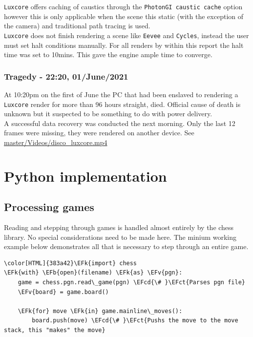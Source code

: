 \documentclass[11pt]{article}
\newcommand{\EFk}[1]{\textcolor{EFk}{#1}} %
\newcommand{\EFb}[1]{\textcolor{EFb}{#1}} %
\newcommand{\EFct}[1]{\textcolor{EFct}{#1}} %
\newcommand{\EFv}[1]{\textcolor{EFv}{#1}} %
\newcommand{\EFcd}[1]{\textcolor{EFcd}{#1}} %
\begin{document}
\texttt{Luxcore} offers caching of caustics through the \texttt{PhotonGI caustic cache} option
however this is only applicable when the scene this static (with the exception of the
camera) and traditional path tracing is used.\\

\texttt{Luxcore} does not finish rendering a scene like \texttt{Eevee} and \texttt{Cycles}, instead
the user must set halt conditions manually. For all renders by within this
report the halt time was set to 10mins. This gave the engine ample time to
converge.
\subsubsection{Tragedy - 22:20, 01/June/2021}
\label{sec:org6038825}
At 10:20pm on the first of June the PC that had been enslaved to rendering a
\texttt{Luxcore} render for more than 96 hours straight, died. Official cause of death is unknown but it
suspected to be something to do with power delivery.\\

A successful data recovery was conducted the next morning. Only the last 12
frames were missing, they were rendered on another device. See
\href{https://github.com/Jake-Moss/blender-chess/blob/master/Videos/disco\_luxcore.mp4}{master/Videos/disco\_luxcore.mp4 }
\section{Python implementation}
\label{sec:org6387c1b}
\subsection{Processing games}
\label{sec:orgb2c64c6}
Reading and stepping through games is handled almost entirely by the chess
library. No special considerations need to be made here. The minium working
example below demonstrates all that is necessary to step through an entire game.

\begin{Code}
\begin{Verbatim}[]
\color[HTML]{383a42}\EFk{import} chess
\EFk{with} \EFb{open}(filename) \EFk{as} \EFv{pgn}:
    game = chess.pgn.read\_game(pgn) \EFcd{\# }\EFct{Parses pgn file}
    \EFv{board} = game.board()

    \EFk{for} move \EFk{in} game.mainline\_moves():
        board.push(move) \EFcd{\# }\EFct{Pushs the move to the move stack, this "makes" the move}
\end{Verbatim}
\end{Code}
\end{document}
